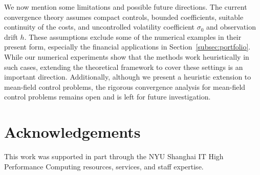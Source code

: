 \documentclass[11pt]{article}
\numberwithin{equation}{section}
\theoremstyle{plain}
\theoremstyle{definition}
\theoremstyle{remark}
\begin{document}
		We now mention some limitations and possible future directions. The current convergence theory assumes compact controls, bounded coefficients, suitable continuity of the costs, and uncontrolled volatility coefficient $\sigma_0$ and observation drift $h$. These assumptions exclude some of the numerical examples in their present form, especially the financial applications in Section~\ref{subsec:portfolio}. While our numerical experiments show that the methods work heuristically in such cases, extending the theoretical framework to cover these settings is an important direction. Additionally, although we present a heuristic extension to mean-field control problems, the rigorous convergence analysis for mean-field control problems remains open and is left for future investigation. 
		
	\section*{Acknowledgements}
	This work was supported in part through the NYU Shanghai IT High Performance Computing resources, services, and staff expertise. 
	
	 
	
\end{document}
